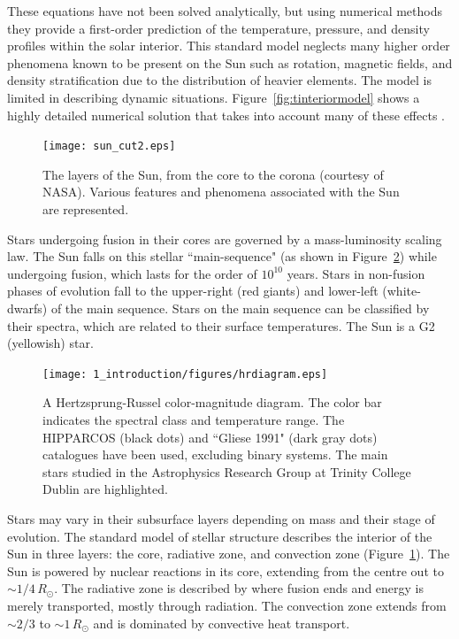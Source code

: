 These equations have not been solved analytically, but using numerical methods they provide a first-order prediction of the temperature, pressure, and density profiles within the solar interior. This standard model neglects many higher order phenomena known to be present on the Sun such as rotation, magnetic fields, and density stratification due to the distribution of heavier elements. The model is limited in describing dynamic situations. Figure~\ref{fig:tinteriormodel} shows a highly detailed numerical solution that takes into account many of these effects \citep{Bahcall:2004}. 

\begin{figure}[!t]
\centerline{\texttt{[image: sun\_cut2.eps]}}
\caption[The layers of the Sun.]{The layers of the Sun, from the core to the corona (courtesy of NASA). Various features and phenomena associated with the Sun are represented.}
\label{fig:tinteriorplot} 
\end{figure}

Stars undergoing fusion in their cores are governed by a mass-luminosity scaling law. The Sun falls on this stellar ``main-sequence" (as shown in Figure~\ref{fig:hrdiag}) while undergoing fusion, which lasts for the order of $10^{10}$ years. Stars in non-fusion phases of evolution fall to the upper-right (red giants) and lower-left (white-dwarfs) of the main sequence. Stars on the main sequence can be classified by their spectra, which are related to their surface temperatures. The Sun is a G2 (yellowish) star.

\begin{figure}[!t]
\centerline{\texttt{[image: 1\_introduction/figures/hrdiagram.eps]}}
\caption[A Hertzsprung-Russel color-magnitude diagram.]{A Hertzsprung-Russel color-magnitude diagram. The color bar indicates the spectral class and temperature range. The HIPPARCOS (black dots) and ``Gliese 1991" (dark gray dots) catalogues have been used, excluding binary systems. The main stars studied in the Astrophysics Research Group at Trinity College Dublin are highlighted.}
\label{fig:hrdiag}
\end{figure}

Stars may vary in their subsurface layers depending on mass and their stage of evolution. The standard model of stellar structure describes the interior of the Sun in three layers: the core, radiative zone, and convection zone (Figure~\ref{fig:tinteriorplot}). The Sun is powered by nuclear reactions in its core, extending from the centre out to $\sim$$1/4$\,$R_{\odot}$. The radiative zone is described by where fusion ends and energy is merely transported, mostly through radiation. The convection zone extends from $\sim$$2/3$ to $\sim$$1\,R_{\odot}$ and is dominated by convective heat transport.

